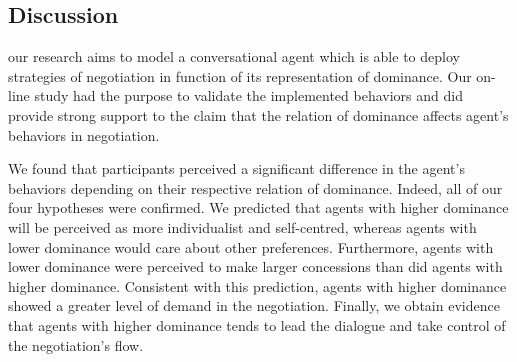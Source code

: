 \documentclass{llncs}
\begin{document}
						
			 \subsection{Discussion}

			 our research aims to model a conversational agent which is able to deploy strategies of negotiation in function of its representation of dominance. Our on-line study had the purpose to validate the implemented behaviors and did provide strong support to the claim that the relation of dominance affects agent's behaviors in negotiation.
			 
			 We found that participants perceived a significant difference in the agent's behaviors depending on their respective relation of dominance.  
			 Indeed, all of our four hypotheses were confirmed. We predicted that agents with higher dominance will be perceived as more individualist and self-centred, whereas agents with lower dominance would care about other preferences. Furthermore, agents with lower dominance were perceived to make larger concessions than did agents with higher dominance. Consistent with this prediction, agents with higher dominance showed a greater level of demand in the negotiation. Finally, we obtain evidence that agents with higher dominance tends to lead the dialogue and take control of the negotiation's flow. 
			 
\end{document}
